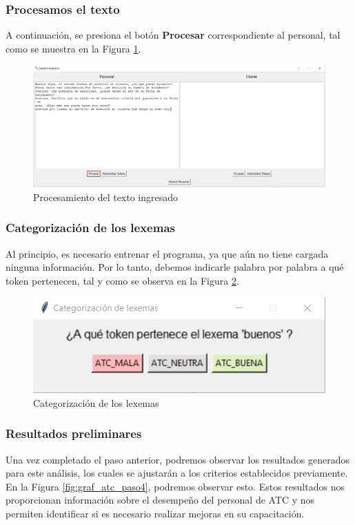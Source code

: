 \documentclass[twocolumn, fontsize=10pt]{article}
\begin{document}
\subsubsection{Procesamos el texto}
A continuación, se presiona el botón \textbf{Procesar} correspondiente al personal, tal como se muestra en la Figura \ref{fig:graf_atc_paso2}.

\begin{figure}[h]
    \centering
    \includegraphics[width=\linewidth]{graficas/ATC_paso2.png}
    \caption{Procesamiento del texto ingresado}
    \label{fig:graf_atc_paso2}
\end{figure}

\subsubsection{Categorización de los lexemas}
Al principio, es necesario entrenar el programa, ya que aún no tiene cargada ninguna información. Por lo tanto, debemos indicarle palabra por palabra a qué token pertenecen, tal y como se observa en la Figura \ref{fig:graf_atc_paso3}.

\begin{figure}[h]
    \centering
    \includegraphics[width=\linewidth]{graficas/ATC_paso3.png}
    \caption{Categorización de los lexemas}
    \label{fig:graf_atc_paso3}
\end{figure}

\subsubsection{Resultados preliminares}
Una vez completado el paso anterior, podremos observar los resultados generados para este análisis, los cuales se ajustarán a los criterios establecidos previamente. En la Figura \ref{fig:graf_atc_paso4}, podremos observar esto. Estos resultados nos proporcionan información sobre el desempeño del personal de ATC y nos permiten identificar si es necesario realizar mejoras en su capacitación.
\end{document}
